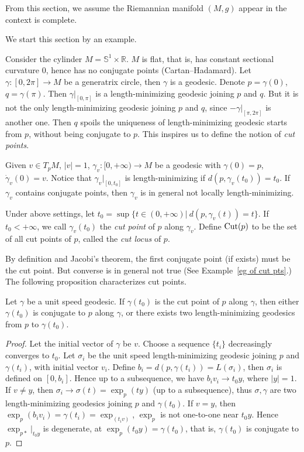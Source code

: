 From this section, we assume the Riemannian manifold $(M,g)$ appear in the context is complete.

We start this section by an example.

\begin{eg}
    Consider the cylinder $M=\mathbb{S}^1\times\mathbb{R}$.
    $M$ is flat, that is, has constant sectional curvature $0$, hence has no conjugate points (Cartan--Hadamard).
    Let $\gamma:[0,2\pi]\to M$ be a generatrix circle, then $\gamma$ is a geodesic.
    Denote $p=\gamma(0)$, $q=\gamma(\pi)$.
    Then $\gamma|_{[0,\pi]}$ is a length-minimizing geodesic joining $p$ and $q$.
    But it is not the only length-minimizing geodesic joining $p$ and $q$, since $-\gamma|_{[\pi,2\pi]}$ is another one.
    Then $q$ spoils the uniqueness of length-minimizing geodesic starts from $p$, without being conjugate to $p$.
    This inspires us to define the notion of \emph{cut points}.
\end{eg}

Given $v\in T_pM$, $|v|=1$, $\gamma_v:[0,+\infty)\to M$ be a geodesic with $\gamma(0)=p$, $\dot{\gamma}_v(0)=v$.
Notice that $\gamma_v|_{[0,t_0]}$ is length-minimizing if $d(p,\gamma_v(t_0))=t_0$.
If $\gamma_v$ contains conjugate points, then $\gamma_v$ is in general not locally length-minimizing.

\begin{defn}
    Under above settings, let $t_0=\sup\{t\in(0,+\infty)|\ d(p,\gamma_v(t))=t\}$.
    If $t_0<+\infty$, we call $\gamma_v(t_0)$ the \emph{cut point} of $p$ along $\gamma_v$.
    Define $\operatorname{Cut}(p)$ to be the set of all cut points of $p$, called the \emph{cut locus} of $p$.
\end{defn}

By definition and Jacobi's theorem, the first conjugate point (if exists) must be the cut point.
But converse is in general not true (See Example~\ref{eg of cut pts}.)
The following proposition characterizes cut points.

\begin{prop}
    Let $\gamma$ be a unit speed geodesic.
    If $\gamma(t_0)$ is the cut point of $p$ along $\gamma$, then either $\gamma(t_0)$ is conjugate to $p$ along $\gamma$, or there exists two length-minimizing geodesics from $p$ to $\gamma(t_0)$.
\end{prop}
\begin{proof}
    Let the initial vector of $\gamma$ be $v$.
    Choose a sequence $\{t_i\}$ decreasingly converges to $t_0$.
    Let $\sigma_i$ be the unit speed length-minimizing geodesic joining $p$ and $\gamma(t_i)$, with initial vector $v_i$.
    Define $b_i=d(p,\gamma(t_i))=L(\sigma_i)$, then $\sigma_i$ is defined on $[0,b_i]$.
    Hence up to a subsequence, we have $b_iv_i\to t_0y$, where $|y|=1$.
    If $v\neq y$, then $\sigma_i\to\sigma(t)=\exp_p(ty)$ (up to a subsequence), thus $\sigma,\gamma$ are two length-minimizing geodesics joining $p$ and $\gamma(t_0)$.
    If $v=y$, then $\exp_p(b_iv_i)=\gamma(t_i)=\exp_(t_iv)$, $\exp_p$ is not one-to-one near $t_0y$.
    Hence $\exp_{p*}|_{t_0y}$ is degenerate, at $\exp_p(t_0y)=\gamma(t_0)$, that is, $\gamma(t_0)$ is conjugate to $p$.
\end{proof}

